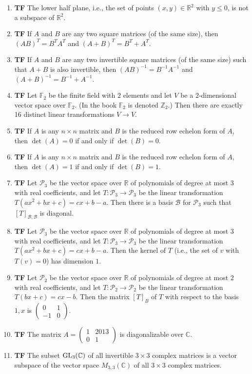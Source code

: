\documentclass[12pt]{article}
\newcommand{\tf}[1]{\item {\bf {\color{blue}\hspace{1em}T\hspace{1em}F}}\hspace{1em} #1\vspace{1.1ex}}
\newcommand{\R}{\mathbb{R}}
\newcommand{\C}{\mathbb{C}}
\newcommand{\F}{\mathbb{F}}
\renewcommand{\P}{\mathcal{P}}
\begin{document}
\begin{enumerate}
\tf{The lower half plane, i.e., the set of points $(x,y) \in \R^2$ with $y\leq 0$, is not a subspace of $\R^2$.}

\tf{If $A$ and $B$ are any two square matrices (of the same size), then $(AB)^T=B^T A^T$ and $(A+B)^T= B^T + A^T$.}

\tf{If $A$ and $B$ are any two invertible square matrices (of the same size) such that $A+B$ is also invertible,
then $(AB)^{-1}=B^{-1} A^{-1}$ and $(A+B)^{-1}= B^{-1} + A^{-1}$.}

\tf{Let $\F_2$ be the finite field with $2$ elements and let $V$ be a $2$-dimensional
    vector space over $\F_2$. (In the book $\F_2$ is denoted $\mathbb{Z}_2$.)   Then there are exactly 16 distinct linear transformations $V\to V$.}


\tf{If $A$ is any $n\times n$ matrix and $B$ is the reduced row echelon form of $A$, then $\det(A)=0$ if and only if $\det(B)=0$.}

\tf{If $A$ is any $n\times n$ matrix and $B$ is the reduced row echelon form of $A$, then $\det(A)=1$ if and only if $\det(B)=1$.}

\tf{Let $\P_3$ be the vector space over $\R$ of polynomials of degree at most $3$ with real coefficients,
and let $T:\P_3\to\P_3$ be the linear transformation $T(ax^2+bx+c)=cx + b-a$.  Then there is a basis $\mathcal{B}$ for $\P_3$ such that $[T]_{\mathcal{B},\mathcal{B}}$ is diagonal.}

\tf{Let $\P_3$ be the vector space over $\R$ of polynomials of degree at most $3$ with real coefficients,
and let $T:\P_3\to\P_3$ be the linear transformation $T(ax^2+bx+c)=cx+b-a$.
Then the kernel of $T$ (i.e., the set of $v$ with $T(v)=0$) has dimension $1$.}

\tf{Let $\P_2$ be the vector space over $\R$ of polynomials of degree at most $2$ with real coefficients,
and let $T:\P_2\to\P_2$ be the linear transformation $T(bx+c)=cx-b$.  Then the matrix $[T]_B$ of $T$
with respect to the basis $1,x$ is $\left(\begin{array}{rr}
0 & 1 \\
-1 & 0
\end{array}\right)$.
}


\tf{The matrix $A=\left(\begin{array}{rr}
1 & 2013 \\
0 & 1
\end{array}\right)$ is diagonalizable over $\C$.}

\tf{The subset ${\rm GL}_3(\C)$ of all invertible $3\times 3$ complex matrices is a vector subspace of
the vector space $M_{3,3}(\C)$ of all $3\times 3$ complex matrices.}


\end{enumerate}
\end{document}
